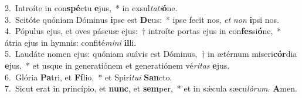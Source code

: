 {2.~}Introíte in con\textbf{spé}ctu \textbf{e}jus,~* in exsul\textit{ta}\textit{ti}\textbf{ó}ne.\\
{3.~}Scitóte quóniam Dóminus \textbf{i}pse est \textbf{De}us:~* ipse fecit nos, \textit{et} \textit{non} \textbf{i}psi nos.\\
{4.~}Pópulus ejus, et oves páscuæ ejus:~† introíte portas ejus in con\textbf{fes}si\textbf{ó}ne,~* átria ejus in hymnis: confité\textit{mi}\textit{ni} \textbf{il}li.\\
{5.~}Laudáte nomen ejus: quóniam suávis est Dóminus,~† in ætérnum miseri\textbf{cór}dia \textbf{e}jus,~* et usque in generatiónem et generatiónem vé\textit{ri}\textit{tas} \textbf{e}jus.\\
{6.~}Glória \textbf{Pa}tri, et \textbf{Fí}lio,~* et Spirí\textit{tu}\textit{i} \textbf{San}cto.\\
{7.~}Sicut erat in princípio, et \textbf{nunc}, et \textbf{sem}per,~* et in sǽcula sæcu\textit{ló}\textit{rum}. \textbf{A}men.\\
